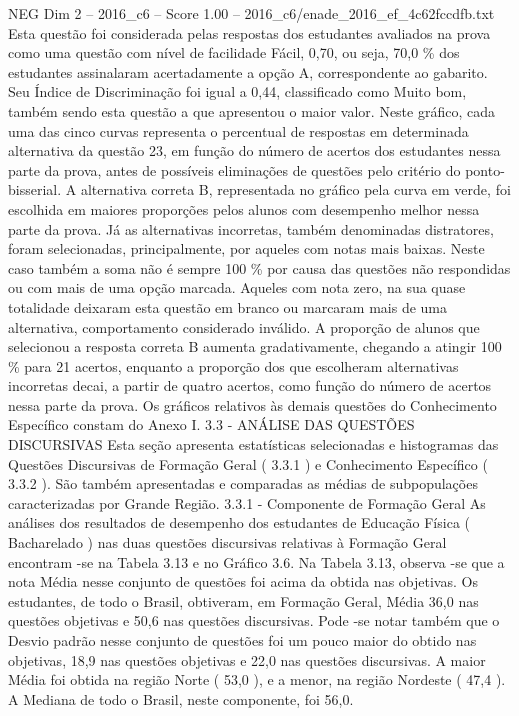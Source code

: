 \begin{textsample}{NEG Dim 2 – 2016\_c6 – Score 1.00 – 2016\_c6/enade\_2016\_ef\_4c62fccdfb.txt}
Esta questão foi considerada pelas respostas dos estudantes avaliados na prova como uma questão com nível de facilidade Fácil, 0,70, ou seja, 70,0 \% dos estudantes assinalaram acertadamente a opção A, correspondente ao gabarito.
Seu Índice de Discriminação foi igual a 0,44, classificado como Muito bom, também sendo esta questão a que apresentou o maior valor.
Neste gráfico, cada uma das cinco curvas representa o percentual de respostas em determinada alternativa da questão 23, em função do número de acertos dos estudantes nessa parte da prova, antes de possíveis eliminações de questões pelo critério do ponto-bisserial.
A alternativa correta B, representada no gráfico pela curva em verde, foi escolhida em maiores proporções pelos alunos com desempenho melhor nessa parte da prova.
Já as alternativas incorretas, também denominadas distratores, foram selecionadas, principalmente, por aqueles com notas mais baixas.
Neste caso também a soma não é sempre 100 \% por causa das questões não respondidas ou com mais de uma opção marcada.
Aqueles com nota zero, na sua quase totalidade deixaram esta questão em branco ou marcaram mais de uma alternativa, comportamento considerado inválido.
A proporção de alunos que selecionou a resposta correta B aumenta gradativamente, chegando a atingir 100 \% para 21 acertos, enquanto a proporção dos que escolheram alternativas incorretas decai, a partir de quatro acertos, como função do número de acertos nessa parte da prova.
Os gráficos relativos às demais questões do Conhecimento Específico constam do Anexo I. 3.3 - ANÁLISE DAS QUESTÕES DISCURSIVAS Esta seção apresenta estatísticas selecionadas e histogramas das Questões Discursivas de Formação Geral ( 3.3.1 ) e Conhecimento Específico ( 3.3.2 ).
São também apresentadas e comparadas as médias de subpopulações caracterizadas por Grande Região. 3.3.1 - Componente de Formação Geral As análises dos resultados de desempenho dos estudantes de Educação Física ( Bacharelado ) nas duas questões discursivas relativas à Formação Geral encontram -se na Tabela 3.13 e no Gráfico 3.6.
Na Tabela 3.13, observa -se que a nota Média nesse conjunto de questões foi acima da obtida nas objetivas.
Os estudantes, de todo o Brasil, obtiveram, em Formação Geral, Média 36,0 nas questões objetivas e 50,6 nas questões discursivas.
Pode -se notar também que o Desvio padrão nesse conjunto de questões foi um pouco maior do obtido nas objetivas, 18,9 nas questões objetivas e 22,0 nas questões discursivas.
A maior Média foi obtida na região Norte ( 53,0 ), e a menor, na região Nordeste ( 47,4 ).
A Mediana de todo o Brasil, neste componente, foi 56,0.

\end{textsample}
